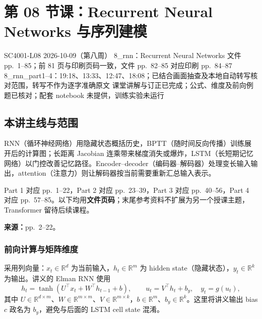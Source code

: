 
\section{第 08 节课：Recurrent Neural Networks 与序列建模}
\label{lecture:SC4001-L08}

\lecturemeta
  {SC4001-L08}
  {2026-10-09（第八周）}
  {8\_rnn：Recurrent Neural Networks}
  {文件 pp.~1--85；前 81 页与印刷页码一致，文件 pp.~82--85 对应印刷 pp.~84--87}
  {8\_rnn\_part1--4：19:18、13:33、12:47、18:08；已结合画面抽查及本地自动转写核对范围，转写不作为逐字准确原文}
  {课堂讲解与订正已完成；公式、维度及前向例题已核对；配套 notebook 未提供，训练实验未运行}

\subsection{本讲主线与范围}

RNN（循环神经网络）用隐藏状态概括历史，BPTT（随时间反向传播）训练展开后的计算图；长距离 Jacobian 连乘带来梯度消失或爆炸，LSTM（长短期记忆网络）以门控改善记忆路径。Encoder--decoder（编码器--解码器）处理变长输入输出，attention（注意力）则让解码器按当前需要重新汇总输入表示。

Part 1 对应 pp.~1--22，Part 2 对应 pp.~23--39，Part 3 对应 pp.~40--56，Part 4 对应 pp.~57--85。以下均用\textbf{文件页码}；末尾参考资料不扩展为另一个授课主题，Transformer 留待后续课程。


\textbf{来源：}pp.~2--22。


\subsubsection{前向计算与矩阵维度}

采用列向量：$x_t\in\mathbb R^d$ 为当前输入，$h_t\in\mathbb R^m$ 为 hidden state（隐藏状态），$y_t\in\mathbb R^k$ 为输出。讲义的 Elman RNN 使用
\[
 \boxed{h_t=\tanh(U^\top x_t+W^\top h_{t-1}+b)},\qquad
 u_t=V^\top h_t+b_y,\quad y_t=g(u_t),
\]
其中 $U\in\mathbb R^{d\times m}$、$W\in\mathbb R^{m\times m}$、$V\in\mathbb R^{m\times k}$，$b\in\mathbb R^m$、$b_y\in\mathbb R^k$。这里将讲义输出 bias $c$ 政名为 $b_y$，避免与后面的 LSTM cell state 混淆。

